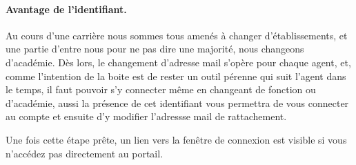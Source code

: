 \paragraph{Avantage de l'identifiant.} Au cours d'une carrière nous sommes tous amenés à changer d'établissements, et une partie d'entre nous pour ne pas dire une majorité, nous changeons d'académie. 
Dès lors, le changement d'adresse mail s'opère pour chaque agent, et, comme l'intention de la boite est de rester un outil pérenne qui suit l'agent dans le temps, il faut pouvoir s'y connecter même en changeant de fonction ou d'académie, aussi la présence de cet identifiant vous permettra de vous connecter au compte et ensuite d'y modifier l'adressse mail de rattachement.

Une fois cette étape prête, un lien vers la fenêtre de connexion est visible si vous n'accédez pas directement au portail.
